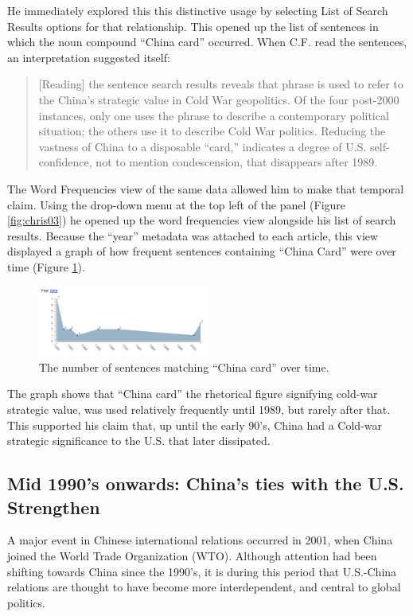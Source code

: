 \documentclass{sig-alternate}
\begin{document}
He immediately explored this this distinctive usage by selecting List of Search Results options for that relationship.  This opened up the list of sentences in which the noun compound ``China card'' occurred.  When C.F. read the sentences, an interpretation suggested itself:
\begin{quote}
[Reading] the sentence search results reveals that phrase is used to refer to the China's strategic value in Cold War geopolitics. Of the four post-2000 instances, only one uses the phrase to describe a contemporary political situation; the others use it to describe Cold War politics. Reducing the vastness of China to a disposable ``card,'' indicates a degree of U.S. self-confidence, not to mention condescension, that disappears after 1989.
\end{quote}

The Word Frequencies view of the same data allowed him to make that temporal claim. Using the drop-down menu at the top left of the panel (Figure \ref{fig:chris03}) he opened up the word frequencies view alongside his list of search results.  Because the ``year'' metadata was attached to each article, this view displayed a graph of how frequent  sentences containing ``China Card'' were over time (Figure \ref{fig:chris02}). 
\begin{figure}[h!]
\includegraphics[width=0.5\textwidth]{fig/chris/02.png}
\caption{ The number of sentences matching ``China card'' over time. \label{fig:chris02}}
\end{figure}
The graph shows that ``China card'' the rhetorical figure signifying cold-war strategic value, was used relatively frequently until 1989, but rarely  after that. This supported his claim that, up until the early 90's, China had a Cold-war strategic significance to the U.S. that later dissipated.

\subsection{Mid 1990's onwards: China's ties with the U.S. Strengthen}

A major event in Chinese international relations occurred in 2001, when China joined the World Trade Organization (WTO).  Although attention had been shifting towards China since the 1990's, it is during this period that U.S.-China relations are thought to have become more interdependent, and central to global politics. 
\end{document}
